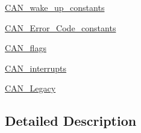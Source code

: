 \begin{DoxyCompactItemize}
\item 
\hyperlink{group___c_a_n__wake__up__constants}{C\+A\+N\+\_\+wake\+\_\+up\+\_\+constants}
\item 
\hyperlink{group___c_a_n___error___code__constants}{C\+A\+N\+\_\+\+Error\+\_\+\+Code\+\_\+constants}
\item 
\hyperlink{group___c_a_n__flags}{C\+A\+N\+\_\+flags}
\item 
\hyperlink{group___c_a_n__interrupts}{C\+A\+N\+\_\+interrupts}
\item 
\hyperlink{group___c_a_n___legacy}{C\+A\+N\+\_\+\+Legacy}
\end{DoxyCompactItemize}


\subsection{Detailed Description}
